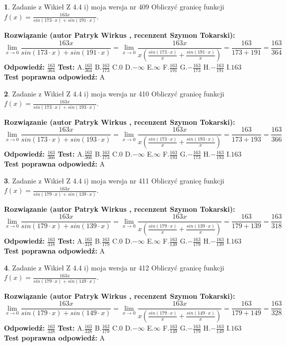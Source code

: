 \documentclass[12pt, a4paper]{article}
\theoremstyle{definition} %
\newtheorem{zad}{}
\newcommand{\zadStart}[1]{\begin{zad}#1\newline}
\newcommand{\zadStop}{\end{zad}}
\newcommand{\rozwStart}[2]{\noindent \textbf{Rozwiązanie (autor #1 , recenzent #2): }\newline}
\newcommand{\rozwStop}{\newline}
\newcommand{\odpStart}{\noindent \textbf{Odpowiedź:}\newline}
\newcommand{\odpStop}{\newline}
\newcommand{\testStart}{\noindent \textbf{Test:}\newline}
\newcommand{\testStop}{\newline}
\newcommand{\kluczStart}{\noindent \textbf{Test poprawna odpowiedź:}\newline}
\newcommand{\kluczStop}{\newline}
\begin{document}
\zadStart{Zadanie z Wikieł Z 4.4 i) moja wersja nr 409}
Obliczyć granicę funkcji $f(x)=\frac{163x}{sin(173\cdot x) +sin(191\cdot x)}$.
\zadStop
\rozwStart{Patryk Wirkus}{Szymon Tokarski}
$$\lim\limits_{x\to 0}\frac{163x}{sin(173\cdot x) +sin(191\cdot x)}=\lim\limits_{x\to 0}\frac{163x}{x(\frac{sin(173\cdot x)}{x}+\frac{sin(191\cdot x)}{x})}=\frac{163}{173+191} = \frac{163}{364}$$
\rozwStop
\odpStart
$\frac{163}{364}$
\odpStop
\testStart
A.$\frac{163}{364}$
B.$\frac{163}{173}$
C.$0$
D.$-\infty$
E.$\infty$
F.$\frac{163}{191}$
G.$-\frac{163}{173}$
H.$-\frac{163}{191}$
I.$163$
\testStop
\kluczStart
A
\kluczStop



\zadStart{Zadanie z Wikieł Z 4.4 i) moja wersja nr 410}
Obliczyć granicę funkcji $f(x)=\frac{163x}{sin(173\cdot x) +sin(193\cdot x)}$.
\zadStop
\rozwStart{Patryk Wirkus}{Szymon Tokarski}
$$\lim\limits_{x\to 0}\frac{163x}{sin(173\cdot x) +sin(193\cdot x)}=\lim\limits_{x\to 0}\frac{163x}{x(\frac{sin(173\cdot x)}{x}+\frac{sin(193\cdot x)}{x})}=\frac{163}{173+193} = \frac{163}{366}$$
\rozwStop
\odpStart
$\frac{163}{366}$
\odpStop
\testStart
A.$\frac{163}{366}$
B.$\frac{163}{173}$
C.$0$
D.$-\infty$
E.$\infty$
F.$\frac{163}{193}$
G.$-\frac{163}{173}$
H.$-\frac{163}{193}$
I.$163$
\testStop
\kluczStart
A
\kluczStop



\zadStart{Zadanie z Wikieł Z 4.4 i) moja wersja nr 411}
Obliczyć granicę funkcji $f(x)=\frac{163x}{sin(179\cdot x) +sin(139\cdot x)}$.
\zadStop
\rozwStart{Patryk Wirkus}{Szymon Tokarski}
$$\lim\limits_{x\to 0}\frac{163x}{sin(179\cdot x) +sin(139\cdot x)}=\lim\limits_{x\to 0}\frac{163x}{x(\frac{sin(179\cdot x)}{x}+\frac{sin(139\cdot x)}{x})}=\frac{163}{179+139} = \frac{163}{318}$$
\rozwStop
\odpStart
$\frac{163}{318}$
\odpStop
\testStart
A.$\frac{163}{318}$
B.$\frac{163}{179}$
C.$0$
D.$-\infty$
E.$\infty$
F.$\frac{163}{139}$
G.$-\frac{163}{179}$
H.$-\frac{163}{139}$
I.$163$
\testStop
\kluczStart
A
\kluczStop



\zadStart{Zadanie z Wikieł Z 4.4 i) moja wersja nr 412}
Obliczyć granicę funkcji $f(x)=\frac{163x}{sin(179\cdot x) +sin(149\cdot x)}$.
\zadStop
\rozwStart{Patryk Wirkus}{Szymon Tokarski}
$$\lim\limits_{x\to 0}\frac{163x}{sin(179\cdot x) +sin(149\cdot x)}=\lim\limits_{x\to 0}\frac{163x}{x(\frac{sin(179\cdot x)}{x}+\frac{sin(149\cdot x)}{x})}=\frac{163}{179+149} = \frac{163}{328}$$
\rozwStop
\odpStart
$\frac{163}{328}$
\odpStop
\testStart
A.$\frac{163}{328}$
B.$\frac{163}{179}$
C.$0$
D.$-\infty$
E.$\infty$
F.$\frac{163}{149}$
G.$-\frac{163}{179}$
H.$-\frac{163}{149}$
I.$163$
\testStop
\kluczStart
A
\kluczStop
\end{document}
